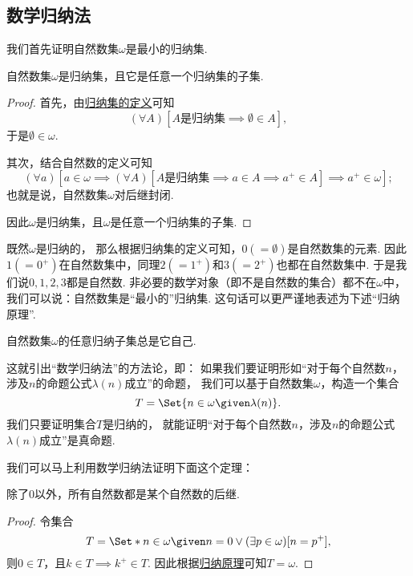 \subsection{数学归纳法}
我们首先证明自然数集\(\omega\)是最小的归纳集.
\begin{theorem}
自然数集\(\omega\)是归纳集，且它是任意一个归纳集的子集.
\begin{proof}
首先，由\hyperref[definition:集合论.归纳集的定义]{归纳集的定义}可知\begin{equation*}
	(\forall A)[\text{\(A\)是归纳集} \implies \emptyset \in A],
\end{equation*}
于是\(\emptyset \in \omega\).

其次，结合自然数的定义可知\begin{equation*}
	(\forall a)[
		a \in \omega
		\implies
		(\forall A)[
			\text{\(A\)是归纳集} \implies a \in A \implies a^+ \in A
		]
		\implies
		a^+ \in \omega
	];
\end{equation*}
也就是说，自然数集\(\omega\)对后继封闭.

因此\(\omega\)是归纳集，且\(\omega\)是任意一个归纳集的子集.
\end{proof}
\end{theorem}

既然\(\omega\)是归纳的，
那么根据归纳集的定义可知，\(0(=\emptyset)\)是自然数集的元素.
因此\(1(=0^+)\)在自然数集中，同理\(2(=1^+)\)和\(3(=2^+)\)也都在自然数集中.
于是我们说\(0,1,2,3\)都是自然数.
非必要的数学对象（即不是自然数的集合）都不在\(\omega\)中，
我们可以说：自然数集是“最小的”归纳集.
这句话可以更严谨地表述为下述“归纳原理”.
\begin{theorem}[归纳原理]\label{theorem:集合论.归纳原理1}
自然数集\(\omega\)的任意归纳子集总是它自己.
\end{theorem}

这就引出“数学归纳法”的方法论，即：
如果我们要证明形如“对于每个自然数\(n\)，涉及\(n\)的命题公式\(\lambda(n)\)成立”的命题，
我们可以基于自然数集\(\omega\)，构造一个集合\begin{equation*}
	T = \Set{ n \in \omega \given \lambda(n) }.
\end{equation*}
我们只要证明集合\(T\)是归纳的，
就能证明“对于每个自然数\(n\)，涉及\(n\)的命题公式\(\lambda(n)\)成立”是真命题.

我们可以马上利用数学归纳法证明下面这个定理：
\begin{theorem}
除了\(0\)以外，所有自然数都是某个自然数的后继.
\begin{proof}
令集合\begin{equation*}
	T = \Set*{ n \in \omega \given n = 0 \lor (\exists p\in\omega)[n = p^+] },
\end{equation*}
则\(0 \in T\)，且\(k \in T \implies k^+ \in T\).
因此根据\hyperref[theorem:集合论.归纳原理1]{归纳原理}可知\(T = \omega\).
\end{proof}
\end{theorem}

